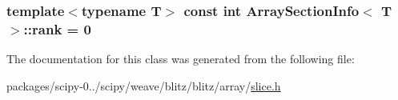 \subsubsection[{rank}]{\setlength{\rightskip}{0pt plus 5cm}template$<$typename T$>$ const int {\bf Array\+Section\+Info}$<$ T $>$\+::rank = 0\hspace{0.3cm}{\ttfamily [static]}}\label{classArraySectionInfo_a8b6c7fecb060615d9f697928aea42d8c}


The documentation for this class was generated from the following file\+:\begin{DoxyCompactItemize}
\item 
packages/scipy-\/0../scipy/weave/blitz/blitz/array/\hyperlink{slice_8h}{slice.\+h}\end{DoxyCompactItemize}
